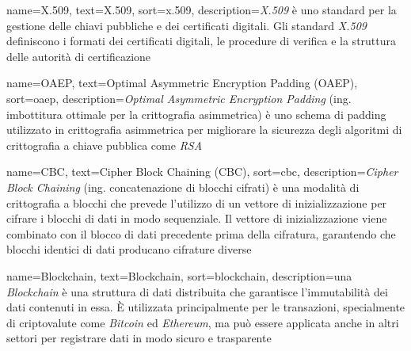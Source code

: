  {
    name=X.509,
    text=X.509,
    sort=x.509,
    description={\emph{X.509} è uno standard per la gestione delle chiavi pubbliche e dei certificati digitali. Gli standard \emph{X.509} definiscono i formati dei certificati digitali, le procedure di verifica e la struttura delle autorità di certificazione}
}

 {
    name=OAEP,
    text=Optimal Asymmetric Encryption Padding (OAEP),
    sort=oaep,
    description={\emph{Optimal Asymmetric Encryption Padding} (ing. imbottitura ottimale per la crittografia asimmetrica) è uno schema di padding utilizzato in crittografia asimmetrica per migliorare la sicurezza degli algoritmi di crittografia a chiave pubblica come \emph{RSA}}
}

 {
    name=CBC,
    text=Cipher Block Chaining (CBC),
    sort=cbc,
    description={\emph{Cipher Block Chaining} (ing. concatenazione di blocchi cifrati) è una modalità di crittografia a blocchi che prevede l'utilizzo di un vettore di inizializzazione per cifrare i blocchi di dati in modo sequenziale. Il vettore di inizializzazione viene combinato con il blocco di dati precedente prima della cifratura, garantendo che blocchi identici di dati producano cifrature diverse}
}

 {
    name=Blockchain,
    text=Blockchain,
    sort=blockchain,
    description={una \emph{Blockchain} è una struttura di dati distribuita che garantisce l'immutabilità dei dati contenuti in essa. È utilizzata principalmente per le transazioni, specialmente di criptovalute come \emph{Bitcoin} ed \emph{Ethereum}, ma può essere applicata anche in altri settori per registrare dati in modo sicuro e trasparente}
}